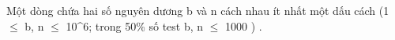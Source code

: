 Một dòng chứa hai số nguyên dương b       và n       cách nhau ít nhất một dấu cách (1  $\le$  b, n  $\le$  10^6; trong 50\% số test b, n  $\le$  1000       )      .  

\